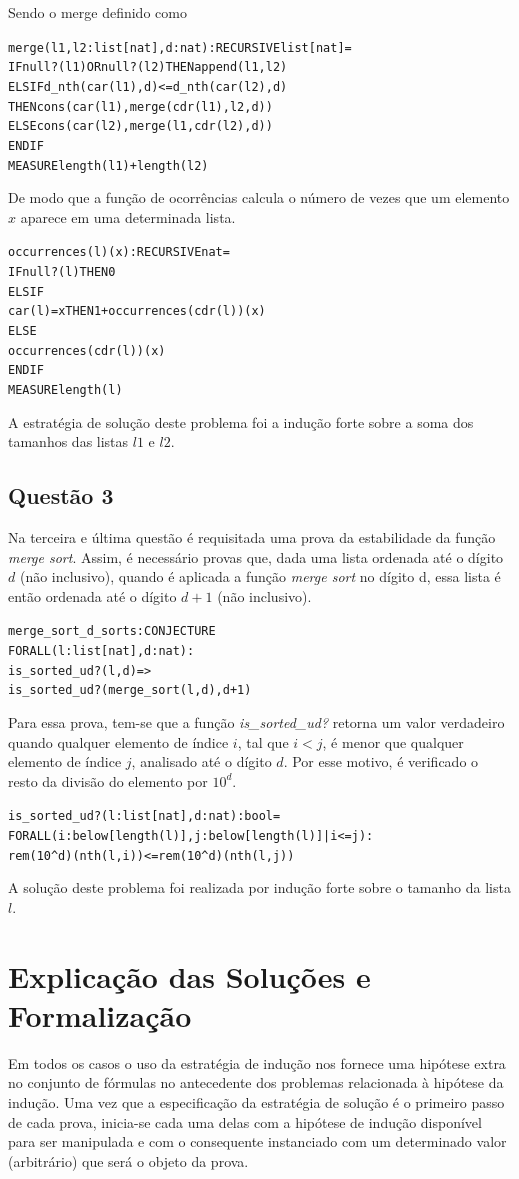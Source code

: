 \documentclass[a4paper, 12pt]{article}
\begin{document}
Sendo o merge definido como
\begin{alltt}
merge(l1, l2 : list[nat], d : nat) : RECURSIVE list[nat] =
IF null?(l1) OR null?(l2) THEN append(l1, l2)
ELSIF d_nth(car(l1),d) <= d_nth(car(l2),d) 
    THEN cons(car(l1), merge(cdr(l1),l2, d))
ELSE cons(car(l2), merge(l1, cdr(l2), d))
ENDIF
MEASURE length(l1) + length(l2)
\end{alltt}

De modo que a função de ocorrências calcula o número de vezes que um elemento $x$ aparece em uma determinada lista.
\begin{alltt}
occurrences(l)(x): RECURSIVE nat =
IF  null?(l) THEN 0
    ELSIF 
      car(l) = x THEN 1 + occurrences(cdr(l))(x)
      ELSE
	occurrences(cdr(l))(x)
	ENDIF
MEASURE length(l)
\end{alltt}

A estratégia de solução deste problema foi a indução forte sobre
a soma dos tamanhos das listas $l1$ e $l2$.

\subsection{Questão 3}
\label{sec:espec-q3}
Na terceira e última questão é requisitada uma prova da estabilidade da função \textit{merge sort}. Assim, é necessário provas que, dada uma lista ordenada até o dígito $d$ (não inclusivo), quando é aplicada a função \textit{merge sort} no dígito d, essa lista é então ordenada até o dígito $d+1$ (não inclusivo). 
\begin{alltt}
  merge_sort_d_sorts : CONJECTURE
   FORALL(l : list[nat], d : nat) :
    is_sorted_ud?(l,d)  => 
    is_sorted_ud?(merge_sort(l,d),d+1)
\end{alltt}

Para essa prova, tem-se que a função \textit{is\_sorted\_ud?} retorna um valor verdadeiro quando qualquer elemento de índice $i$, tal que $i < j$, é menor que qualquer elemento de índice $j$, analisado até o dígito $d$. Por esse motivo, é verificado o resto da divisão do elemento por $10^d$.
\begin{alltt}
 is_sorted_ud?(l : list[nat], d : nat) : bool =
 FORALL(i : below[length(l)], j : below[length(l)] | i <= j) :
    rem(10^d)(nth(l,i)) <= rem(10^d)(nth(l,j))
\end{alltt}


A solução deste problema foi realizada por indução forte sobre o
tamanho da lista $l$.

\section{Explicação das Soluções e Formalização}
Em todos os casos o uso da estratégia de indução nos fornece uma
hipótese extra no conjunto de fórmulas no antecedente dos problemas
relacionada à hipótese da indução. Uma vez que a especificação da
estratégia de solução é o primeiro passo de cada prova, inicia-se
cada uma delas com a hipótese de indução disponível para ser
manipulada e com o consequente instanciado com um determinado
valor (arbitrário) que será o objeto da prova.
\end{document}
